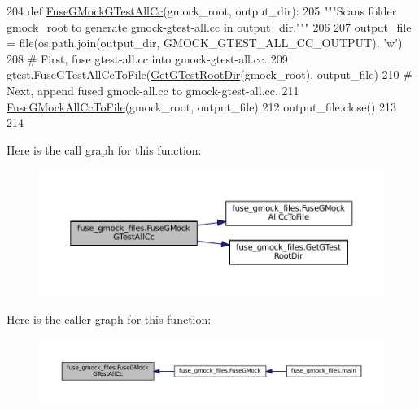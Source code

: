 \begin{DoxyCode}
204 \textcolor{keyword}{def }\hyperlink{namespacefuse__gmock__files_a50eb499fcb075e19191e8403bd85c813}{FuseGMockGTestAllCc}(gmock\_root, output\_dir):
205   \textcolor{stringliteral}{"""Scans folder gmock\_root to generate gmock-gtest-all.cc in output\_dir."""}
206 
207   output\_file = file(os.path.join(output\_dir, GMOCK\_GTEST\_ALL\_CC\_OUTPUT), \textcolor{stringliteral}{'w'})
208   \textcolor{comment}{# First, fuse gtest-all.cc into gmock-gtest-all.cc.}
209   gtest.FuseGTestAllCcToFile(\hyperlink{namespacefuse__gmock__files_aae591d77d2d969394996f9fc2017824c}{GetGTestRootDir}(gmock\_root), output\_file)
210   \textcolor{comment}{# Next, append fused gmock-all.cc to gmock-gtest-all.cc.}
211   \hyperlink{namespacefuse__gmock__files_af470a39a4df492b1ca0d9493eac8222b}{FuseGMockAllCcToFile}(gmock\_root, output\_file)
212   output\_file.close()
213 
214 
\end{DoxyCode}
Here is the call graph for this function\+:
\nopagebreak
\begin{figure}[H]
\begin{center}
\leavevmode
\includegraphics[width=350pt]{namespacefuse__gmock__files_a50eb499fcb075e19191e8403bd85c813_cgraph}
\end{center}
\end{figure}
Here is the caller graph for this function\+:
\nopagebreak
\begin{figure}[H]
\begin{center}
\leavevmode
\includegraphics[width=350pt]{namespacefuse__gmock__files_a50eb499fcb075e19191e8403bd85c813_icgraph}
\end{center}
\end{figure}
\mbox{\label{namespacefuse__gmock__files_abab451606f671f59404f23276aad2c34}} 
